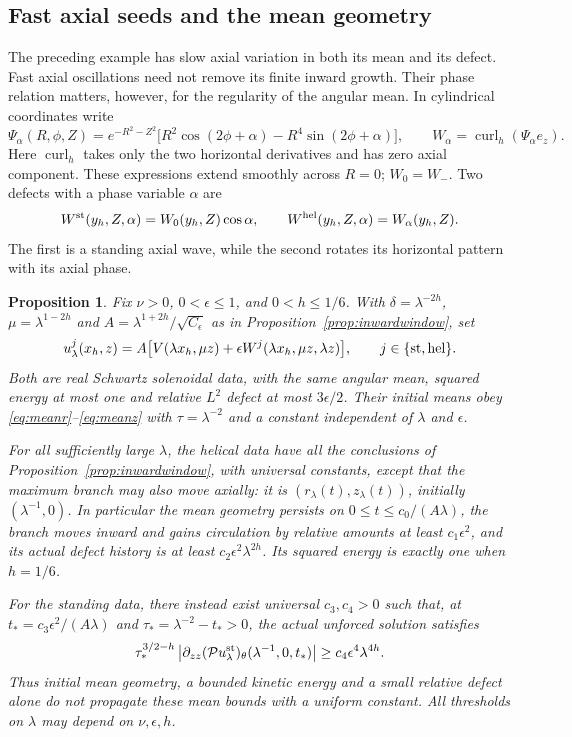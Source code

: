\documentclass[11pt]{article}
\newtheorem{proposition}[theorem]{Proposition}
\theoremstyle{remark}
\newcommand{\PP}{\mathcal P}
\newcommand{\curl}{\operatorname{curl}}
\begin{document}
\subsection{Fast axial seeds and the mean geometry}

The preceding example has slow axial variation in both its mean and its
defect. Fast axial oscillations need not remove its finite inward growth.
Their phase relation matters, however, for the regularity of the angular
mean. In cylindrical coordinates write
\[
 \Psi_\alpha(R,\phi,Z)=e^{-R^2-Z^2}
       \big[R^2\cos(2\phi+\alpha)-R^4\sin(2\phi+\alpha)\big],
 \qquad W_\alpha=\curl_h(\Psi_\alpha e_z).
\]
Here $\curl_h$ takes only the two horizontal derivatives and has zero
axial component. These expressions extend smoothly across $R=0$;
$W_0=W_-$. Two defects with a phase variable $\alpha$ are
\[
 W^{\rm st}(y_h,Z,\alpha)=W_0(y_h,Z)\cos\alpha,
 \qquad W^{\rm hel}(y_h,Z,\alpha)=W_\alpha(y_h,Z).
\]
The first is a standing axial wave, while the second rotates its
horizontal pattern with its axial phase.

\begin{proposition}\label{prop:fastseeds}
Fix $\nu>0$, $0<\epsilon\leq1$, and $0<h\leq1/6$. With
$\delta=\lambda^{-2h}$, $\mu=\lambda^{1-2h}$ and
$A=\lambda^{1+2h}/\sqrt{C_\epsilon}$ as in
Proposition~\ref{prop:inwardwindow}, set
\[
 u^j_\lambda(x_h,z)
   =A\big[V(\lambda x_h,\mu z)
       +\epsilon W^j(\lambda x_h,\mu z,\lambda z)\big],
 \qquad j\in\{{\rm st},{\rm hel}\}.
\]
Both are real Schwartz solenoidal data, with the same angular mean,
squared energy at most one and relative $L^2$ defect at most
$3\epsilon/2$. Their initial means obey
\eqref{eq:meanr}--\eqref{eq:meanz} with $\tau=\lambda^{-2}$ and
a constant independent of $\lambda$ and $\epsilon$.

For all sufficiently large $\lambda$, the helical data have all the
conclusions of Proposition~\ref{prop:inwardwindow}, with universal
constants, except that the maximum branch may also move axially:
it is $(r_\lambda(t),z_\lambda(t))$, initially $(\lambda^{-1},0)$.
In particular the mean geometry persists on $0\leq t\leq c_0/(A\lambda)$,
the branch moves inward and gains circulation by relative amounts
at least $c_1\epsilon^2$, and its actual defect history is at least
$c_2\epsilon^2\lambda^{2h}$. Its squared energy is exactly one
when $h=1/6$.

For the standing data, there instead exist universal $c_3,c_4>0$
such that, at $t_*=c_3\epsilon^2/(A\lambda)$ and
$\tau_* =\lambda^{-2}-t_*>0$, the actual unforced solution satisfies
\begin{equation}\label{eq:fastMeanCurvature}
 \tau_*^{3/2-h}
 \left|\partial_{zz}(\PP u^{\rm st}_\lambda)_\theta
                         (\lambda^{-1},0,t_*)\right|
                        \geq c_4\epsilon^4\lambda^{4h}.
\end{equation}
Thus initial mean geometry, a bounded kinetic energy and a small relative
defect alone do not propagate these mean bounds with a uniform constant.
All thresholds on $\lambda$ may depend on $\nu,\epsilon,h$.
\end{proposition}
\end{document}
